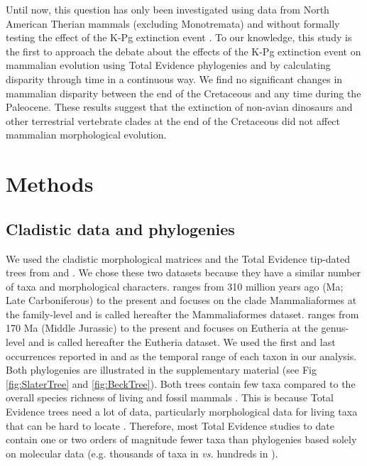 Until now, this question has only been investigated using data from North American Therian mammals (excluding Monotremata) and without formally testing the effect of the K-Pg extinction event \citep{Wilson2013}.
To our knowledge, this study is the first to approach the debate about the effects of the K-Pg extinction event on mammalian evolution using Total Evidence phylogenies and by calculating disparity through time in a continuous way.
We find no significant changes in mammalian disparity between the end of the Cretaceous and any time during the Paleocene. 
These results suggest that the extinction of non-avian dinosaurs and other terrestrial vertebrate clades at the end of the Cretaceous did not affect mammalian morphological evolution.

%
%

\section{Methods}

\subsection{Cladistic data and phylogenies}
We used the cladistic morphological matrices and the Total Evidence tip-dated trees \citep{ronquista2012} from \citet[][103 taxa with 446 morphological characters;]{Slater2012MEE} and \citet[][102 taxa with 421 morphological characters]{beckancient2014}.
We chose these two datasets because they have a similar number of taxa and morphological characters.
\cite{Slater2012MEE} ranges from 310 million years ago (Ma; Late Carboniferous) to the present and focuses on the clade Mammaliaformes at the family-level and is called hereafter the Mammaliaformes dataset.
\cite{beckancient2014} ranges from 170 Ma (Middle Jurassic) to the present and focuses on Eutheria at the genus-level and is called hereafter the Eutheria dataset.
We used the first and last occurrences reported in \cite{Slater2012MEE} and \cite{beckancient2014} as the temporal range of each taxon in our analysis.
Both phylogenies are illustrated in the supplementary material (see Fig \ref{fig:SlaterTree} and \ref{fig:BeckTree}).
Both trees contain few taxa compared to the overall species richness of living and fossil mammals \citep{bininda-emondsthe2007,archibald2011extinction}.
This is because Total Evidence trees need a lot of data, particularly morphological data for living taxa that can be hard to locate \citep{GuillermeCooper}.
Therefore, most Total Evidence studies to date contain one or two orders of magnitude fewer taxa than phylogenies based solely on molecular data (e.g. thousands of taxa in \citealt{bininda-emondsthe2007,meredithimpacts2011} \textit{vs.} hundreds in \citealt{ronquista2012,Slater2012MEE,Wood01032013,beckancient2014}).

